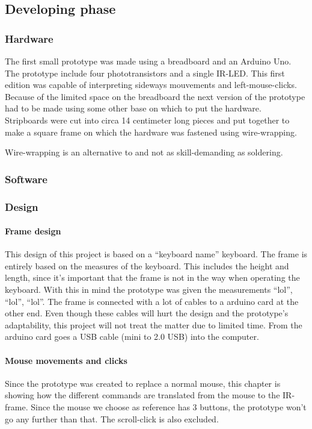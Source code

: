 \documentclass[a4paper,11pt]{article}
\begin{document}
\subsection{Developing phase}
\subsubsection{Hardware}
The first small prototype was made using a breadboard and an Arduino Uno. The prototype
include four phototransistors and a single IR-LED. This first edition was capable of interpreting
sideways mouvements and left-mouse-clicks. Because of the limited space on the breadboard
the next version of the prototype had to be made using some other base on which to put the 
hardware.\\
Stripboards were cut into circa 14 centimeter long pieces and put together to make a square
frame on which the hardware was fastened using wire-wrapping.

Wire-wrapping is an alternative to and not as skill-demanding as soldering.

\subsubsection{Software}

\subsubsection{Design}
\paragraph{Frame design}
This design of this project is based on a “keyboard name” keyboard. The frame is 
entirely based on the measures of the keyboard. This includes the height and length, 
since it’s important that the frame is not in the way when operating the keyboard. 
With this in mind the prototype was given the measurements “lol”, “lol”, “lol”. The 
frame is connected with a lot of cables to a arduino card at the other end. Even 
though these cables will hurt the design and the prototype’s adaptability, this project 
will not treat the matter due to limited time. From the arduino card goes a 
USB cable (mini to 2.0 USB)  into the computer.

\paragraph{Mouse movements and clicks}
 Since the prototype was created to replace a normal mouse, this chapter is showing 
 how the different commands are translated from the mouse to the IR-frame. 
 Since the mouse we choose as reference has 3 buttons, the prototype won’t go any 
 further than that. The scroll-click is also excluded.
\end{document}
